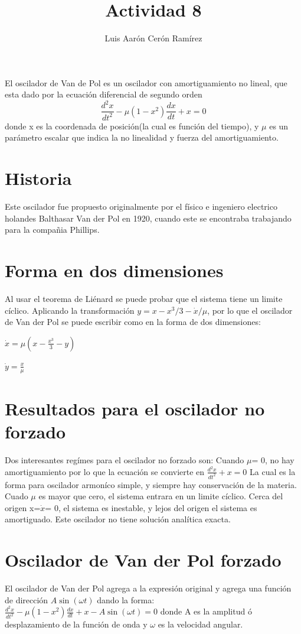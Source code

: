 \documentclass{article}
\title{Actividad 8}
\author{Luis Aarón Cerón Ramírez}
\begin{document}
\maketitle
El oscilador de Van de Pol es un oscilador con amortiguamiento no lineal, que esta dado por la ecuación diferencial de segundo orden
\begin{displaymath}
\frac{d^2x}{dt^2}-\mu(1-x^2)\frac{dx}{dt}+x=0
\end{displaymath}
\newline
donde x es la coordenada de posición(la cual es función del tiempo), y $\mu$ es un parámetro escalar que indica la no linealidad y fuerza del amortiguamiento.

\section{Historia}
Este oscilador fue propuesto originalmente por el físico e ingeniero electrico holandes Balthasar Van der Pol en 1920, cuando este se encontraba trabajando para la compañia Phillips.

\section{Forma en dos dimensiones}
Al usar el teorema de Liénard se puede probar que el sistema tiene un limite cíclico. Aplicando la transformación $y=x-x^3/3-\dot x/\mu$, por lo que el oscilador de Van der Pol se puede escribir como en la forma de dos dimensiones:

$\dot x=\mu(x-\frac{x^3}{3}-y)$

$\dot y= \frac{x}{\mu}$

\section{Resultados para el oscilador no forzado}
Dos interesantes regímes para el oscilador no forzado son:
Cuando $\mu$= 0, no hay amortiguamiento por lo que la ecuación se convierte en
\newline
$\frac{d^2x}{dt^2}+x=0$
\newline
La cual es la forma para oscilador armoníco simple, y siempre hay conservación de la materia. Cuado $\mu$ es mayor que cero, el sistema entrara en un limite cíclico. Cerca del origen x=$\dot x$= 0, el sistema es inestable, y lejos del origen el sistema es amortiguado. Este oscilador no tiene solución analítica exacta.

\section{Oscilador de Van der Pol forzado}
El oscilador de Van der Pol agrega a la expresión original y agrega una función de dirección $A\sin(\omega t)$ dando la forma:
\newline
$\frac{d^2x}{dt^2}-\mu(1-x^2)\frac{dx}{dt}+x-A\sin(\omega t)=0$
\newline
donde A es la amplitud ó desplazamiento de la función de onda y $\omega$ es la velocidad angular.
\end{document}
